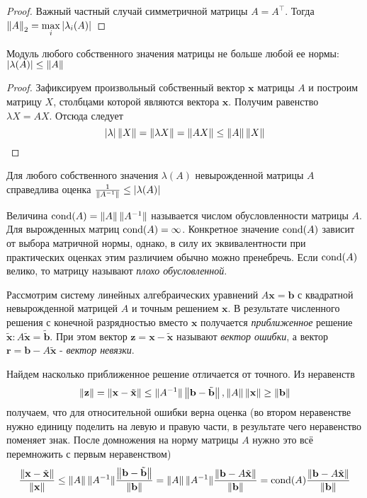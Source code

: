 \begin{theorem}
\begin{proof}
    Важный частный случай симметричной матрицы $A = A^\intercal$. Тогда $\left\lVert A\right\rVert_2 = \max\limits_i\left\lvert\lambda_i(A)\right\rvert$
  \end{proof}
\end{theorem}

\begin{theorem}
  Модуль любого собственного значения матрицы не больше любой ее нормы: $\left\lvert\lambda(A)\right\rvert \le \left\lVert A\right\rVert$

  \begin{proof}
    Зафиксируем произвольный собственный вектор $\mathbf{x}$ матрицы $A$ и построим матрицу $X$, столбцами которой являются вектора $\mathbf{x}$. Получим равенство $\lambda X = AX$. Отсюда следует
    $$
      \left\lvert\lambda\right\rvert \left\lVert X\right\rVert = \left\lVert\lambda X\right\rVert = \left\lVert AX\right\rVert \le \left\lVert A\right\rVert \left\lVert X\right\rVert
    $$
  \end{proof}
\end{theorem}

\begin{corollary}
  Для любого собственного значения $\lambda(A)$ невырожденной матрицы $A$ справедлива оценка $\frac{1}{\left\lVert A^{-1}\right\rVert} \le \left\lvert\lambda(A)\right\rvert$
\end{corollary}

\begin{definition}
  Величина $\operatorname{cond}(A) = \left\lVert A\right\rVert\lVert A^{-1} \rVert$ называется числом обусловленности матрицы $A$. Для вырожденных матриц $\operatorname{cond}(A) = \infty$. Конкретное значение $\operatorname{cond}(A)$ зависит от выбора матричной нормы, однако, в силу их эквивалентности при практических оценках этим различием обычно можно пренебречь. Если $\operatorname{cond}(A)$ велико, то матрицу называют \textit{плохо обусловленной}.
\end{definition}

Рассмотрим систему линейных алгебраических уравнений $A\mathbf{x} = \mathbf{b}$ с квадратной невырожденной матрицей $A$ и точным решением $\mathbf{x}$. В результате численного решения с конечной разрядностью вместо $\mathbf{x}$ получается \textit{приближенное} решение $\tilde{\mathbf{x}} : A\tilde{\mathbf{x}} = \tilde{\mathbf{b}}$. При этом вектор $\mathbf{z} = \mathbf{x} - \tilde{\mathbf{x}}$ называют \textit{вектор ошибки}, а вектор $\mathbf{r} = \mathbf{b} - A\tilde{\mathbf{x}}$ - \textit{вектор невязки}.

Найдем насколько приближенное решение отличается от точного. Из неравенств
$$
  \left\lVert\mathbf{z}\right\rVert = \left\lVert\mathbf{x} - \tilde{\mathbf{x}}\right\rVert \le \lVert A^{-1} \rVert \left\lVert\mathbf{b} - \tilde{\mathbf{b}}\right\rVert, \left\lVert A\right\rVert \left\lVert\mathbf{x}\right\rVert \ge \left\lVert\mathbf{b}\right\rVert
$$
получаем, что для относительной ошибки верна оценка (во втором неравенстве нужно единицу поделить на левую и правую части, в результате чего неравенство поменяет знак. После домножения на норму матрицы $A$ нужно это всё перемножить с первым неравенством)
$$
  \frac{\left\lVert\mathbf{x} - \tilde{\mathbf{x}}\right\rVert}{\left\lVert\mathbf{x}\right\rVert} \le \left\lVert A\right\rVert\lVert A^{-1} \rVert \frac{\left\lVert\mathbf{b} - \tilde{\mathbf{b}}\right\rVert}{\left\lVert\mathbf{b}\right\rVert} = \left\lVert A\right\rVert\lVert A^{-1} \rVert \frac{\left\lVert\mathbf{b} - A\tilde{\mathbf{x}}\right\rVert}{\left\lVert\mathbf{b}\right\rVert} = \operatorname{cond}(A) \frac{\left\lVert\mathbf{b} - A\tilde{\mathbf{x}}\right\rVert}{\left\lVert\mathbf{b}\right\rVert}
$$
